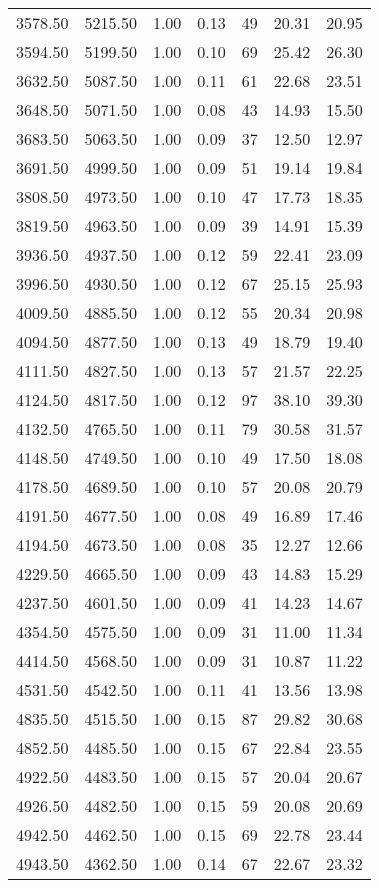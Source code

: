 \begin{table}
\begin{tabular}{rrrrrrr}
3578.50 & 5215.50 & 1.00 & 0.13 & 49 & 20.31 & 20.95 \\
3594.50 & 5199.50 & 1.00 & 0.10 & 69 & 25.42 & 26.30 \\
3632.50 & 5087.50 & 1.00 & 0.11 & 61 & 22.68 & 23.51 \\
3648.50 & 5071.50 & 1.00 & 0.08 & 43 & 14.93 & 15.50 \\
3683.50 & 5063.50 & 1.00 & 0.09 & 37 & 12.50 & 12.97 \\
3691.50 & 4999.50 & 1.00 & 0.09 & 51 & 19.14 & 19.84 \\
3808.50 & 4973.50 & 1.00 & 0.10 & 47 & 17.73 & 18.35 \\
3819.50 & 4963.50 & 1.00 & 0.09 & 39 & 14.91 & 15.39 \\
3936.50 & 4937.50 & 1.00 & 0.12 & 59 & 22.41 & 23.09 \\
3996.50 & 4930.50 & 1.00 & 0.12 & 67 & 25.15 & 25.93 \\
4009.50 & 4885.50 & 1.00 & 0.12 & 55 & 20.34 & 20.98 \\
4094.50 & 4877.50 & 1.00 & 0.13 & 49 & 18.79 & 19.40 \\
4111.50 & 4827.50 & 1.00 & 0.13 & 57 & 21.57 & 22.25 \\
4124.50 & 4817.50 & 1.00 & 0.12 & 97 & 38.10 & 39.30 \\
4132.50 & 4765.50 & 1.00 & 0.11 & 79 & 30.58 & 31.57 \\
4148.50 & 4749.50 & 1.00 & 0.10 & 49 & 17.50 & 18.08 \\
4178.50 & 4689.50 & 1.00 & 0.10 & 57 & 20.08 & 20.79 \\
4191.50 & 4677.50 & 1.00 & 0.08 & 49 & 16.89 & 17.46 \\
4194.50 & 4673.50 & 1.00 & 0.08 & 35 & 12.27 & 12.66 \\
4229.50 & 4665.50 & 1.00 & 0.09 & 43 & 14.83 & 15.29 \\
4237.50 & 4601.50 & 1.00 & 0.09 & 41 & 14.23 & 14.67 \\
4354.50 & 4575.50 & 1.00 & 0.09 & 31 & 11.00 & 11.34 \\
4414.50 & 4568.50 & 1.00 & 0.09 & 31 & 10.87 & 11.22 \\
4531.50 & 4542.50 & 1.00 & 0.11 & 41 & 13.56 & 13.98 \\
4835.50 & 4515.50 & 1.00 & 0.15 & 87 & 29.82 & 30.68 \\
4852.50 & 4485.50 & 1.00 & 0.15 & 67 & 22.84 & 23.55 \\
4922.50 & 4483.50 & 1.00 & 0.15 & 57 & 20.04 & 20.67 \\
4926.50 & 4482.50 & 1.00 & 0.15 & 59 & 20.08 & 20.69 \\
4942.50 & 4462.50 & 1.00 & 0.15 & 69 & 22.78 & 23.44 \\
4943.50 & 4362.50 & 1.00 & 0.14 & 67 & 22.67 & 23.32 \\
\bottomrule
\end{tabular}
\end{table}
